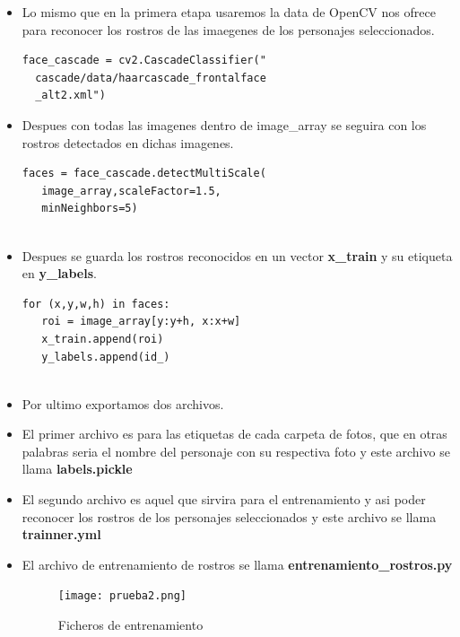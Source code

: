 \documentclass{vgtc}                          %
\begin{document}
\begin{itemize}
\item Lo mismo que en la primera etapa usaremos la data de OpenCV nos ofrece para reconocer los rostros de las imaegenes de los personajes seleccionados.

\begin{lstlisting}
face_cascade = cv2.CascadeClassifier("
  cascade/data/haarcascade_frontalface
  _alt2.xml")
\end{lstlisting}

\item Despues con todas las imagenes dentro de image\_array se seguira con los rostros detectados en dichas imagenes.

\begin{lstlisting}
faces = face_cascade.detectMultiScale(
   image_array,scaleFactor=1.5, 
   minNeighbors=5)
            
\end{lstlisting}

\item Despues se guarda los rostros reconocidos en un vector \textbf{x\_train} y su etiqueta en \textbf{y\_labels}.

\begin{lstlisting}
for (x,y,w,h) in faces:
   roi = image_array[y:y+h, x:x+w]
   x_train.append(roi)
   y_labels.append(id_)
            
\end{lstlisting}

\item Por ultimo exportamos dos archivos.

\item El primer archivo es para las etiquetas de cada carpeta de fotos, que en otras palabras seria el nombre del personaje con su respectiva foto y este archivo se llama \textbf{labels.pickle}

\item El segundo archivo es aquel que sirvira para el entrenamiento y asi poder reconocer los rostros de los personajes seleccionados y este archivo se llama \textbf{trainner.yml}

\item El archivo de entrenamiento de rostros se llama \textbf{entrenamiento\_rostros.py}

\begin{figure}[h]
	\centering
	\texttt{[image: prueba2.png]}
	\caption{Ficheros de entrenamiento}
\end{figure}

\end{itemize}
\end{document}
